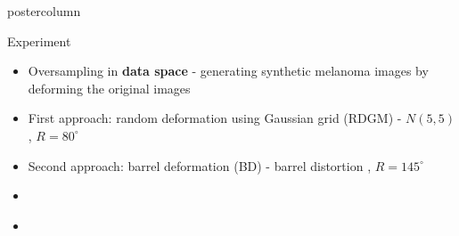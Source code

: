 \documentclass[final]{beamer}
\begin{document}
\begin{frame}
\begin{columns}
\begin{column}{.49\textwidth}
\begin{beamercolorbox}[center,wd=\textwidth]{postercolumn}
\begin{minipage}[T]{.95\textwidth}
{\begin{block}{Experiment}
\begin{itemize}
\begin{itemize}
            		 \item Oversampling in \textbf{data space} - generating synthetic melanoma images by deforming the original images
            		 \item First approach: random deformation using Gaussian grid (RDGM) - $N(5,5)$, $R = 80^{\circ}$
            		 \item Second approach: barrel deformation (BD) - barrel distortion , $R = 145^{\circ}$
            		 \item[]
            		 \item[]
            		 \begin{columns}
            		 	\begin{column}{.33\textwidth}
            		 	 	\\
            		 	\end{column}
            		 	\begin{column}{.33\textwidth}
            		 	\\
            		 	\end{column}

\end{columns}
\end{itemize}
\end{itemize}
\end{block}}
\end{minipage}
\end{beamercolorbox}
\end{column}
\end{columns}
\end{frame}
\end{document}
